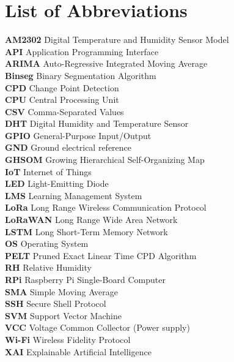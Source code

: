 \documentclass[12pt,a4paper]{report}
\begin{document}
\chapter*{List of Abbreviations}
\begin{tabbing}
\textbf{AM2302} \hspace{1cm} \= Digital Temperature and Humidity Sensor Model \\
\textbf{API} \> Application Programming Interface \\
\textbf{ARIMA} \> Auto-Regressive Integrated Moving Average \\
\textbf{Binseg} \> Binary Segmentation Algorithm \\
\textbf{CPD} \> Change Point Detection \\
\textbf{CPU} \> Central Processing Unit \\
\textbf{CSV} \> Comma-Separated Values \\
\textbf{DHT} \> Digital Humidity and Temperature Sensor \\
\textbf{GPIO} \> General-Purpose Input/Output \\
\textbf{GND} \> Ground electrical reference \\
\textbf{GHSOM} \> Growing Hierarchical Self-Organizing Map \\
\textbf{IoT} \> Internet of Things \\
\textbf{LED} \> Light-Emitting Diode \\
\textbf{LMS} \> Learning Management System \\
\textbf{LoRa} \> Long Range Wireless Communication Protocol \\
\textbf{LoRaWAN} \> Long Range Wide Area Network \\
\textbf{LSTM} \> Long Short-Term Memory Network \\
\textbf{OS} \> Operating System \\
\textbf{PELT} \> Pruned Exact Linear Time CPD Algorithm \\
\textbf{RH} \> Relative Humidity \\
\textbf{RPi} \> Raspberry Pi Single-Board Computer \\
\textbf{SMA} \> Simple Moving Average \\
\textbf{SSH} \> Secure Shell Protocol \\
\textbf{SVM} \> Support Vector Machine \\
\textbf{VCC} \> Voltage Common Collector (Power supply) \\
\textbf{Wi-Fi} \> Wireless Fidelity Protocol \\
\textbf{XAI} \> Explainable Artificial Intelligence
\end{tabbing}
\end{document}
